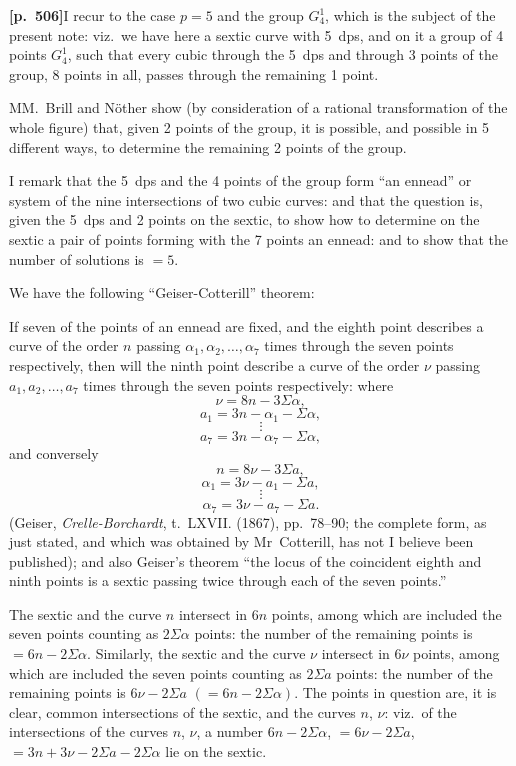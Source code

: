 \documentclass[11pt,a4paper]{article}
\begin{document}
\noindent\textbf{[p.~506]}\quad I recur to the case $p = 5$ and the group $G_{4}^{1}$, which is the subject of the present note: viz.\ we have here a sextic curve with 5~dps, and on it a group of 4 points $G_{4}^{1}$, such that every cubic through the 5~dps and through 3 points of the group, 8 points in all, passes through the remaining 1 point.

MM.~Brill and N\"other show (by consideration of a rational transformation of the whole figure) that, given 2 points of the group, it is possible, and possible in 5 different ways, to determine the remaining 2 points of the group.

I remark that the 5~dps and the 4 points of the group form ``an ennead'' or system of the nine intersections of two cubic curves: and that the question is, given the 5~dps and 2 points on the sextic, to show how to determine on the sextic a pair of points forming with the 7 points an ennead: and to show that the number of solutions is $= 5$.

We have the following ``Geiser-Cotterill'' theorem:

If seven of the points of an ennead are fixed, and the eighth point describes a curve of the order $n$ passing $\alpha_{1}, \alpha_{2}, \ldots, \alpha_{7}$ times through the seven points respectively, then will the ninth point describe a curve of the order $\nu$ passing $a_{1}, a_{2}, \ldots, a_{7}$ times through the seven points respectively: where
\[
\nu = 8n - 3\Sigma\alpha,
\]
\[
a_{1} = 3n - \alpha_{1} - \Sigma\alpha,
\]
\[
\vdots
\]
\[
a_{7} = 3n - \alpha_{7} - \Sigma\alpha,
\]
and conversely
\[
n = 8\nu - 3\Sigma a,
\]
\[
\alpha_{1} = 3\nu - a_{1} - \Sigma a,
\]
\[
\vdots
\]
\[
\alpha_{7} = 3\nu - a_{7} - \Sigma a.
\]
(Geiser, \textit{Crelle-Borchardt}, t.~LXVII. (1867), pp.~78--90; the complete form, as just stated, and which was obtained by Mr~Cotterill, has not I believe been published); and also Geiser's theorem ``the locus of the coincident eighth and ninth points is a sextic passing twice through each of the seven points.''

The sextic and the curve $n$ intersect in $6n$ points, among which are included the seven points counting as $2\Sigma\alpha$ points: the number of the remaining points is $= 6n - 2\Sigma\alpha$. Similarly, the sextic and the curve $\nu$ intersect in $6\nu$ points, among which are included the seven points counting as $2\Sigma a$ points: the number of the remaining points is $6\nu - 2\Sigma a$ $(= 6n - 2\Sigma\alpha)$. The points in question are, it is clear, common intersections of the sextic, and the curves $n$, $\nu$: viz.\ of the intersections of the curves $n$, $\nu$, a number $6n - 2\Sigma\alpha$, $= 6\nu - 2\Sigma a$, $= 3n + 3\nu - 2\Sigma a - 2\Sigma\alpha$ lie on the sextic.
\end{document}
